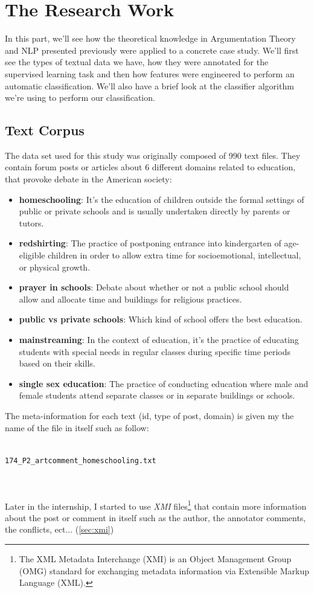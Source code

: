 \chapter{The Research Work} 
In this part, we'll see how the theoretical knowledge in Argumentation Theory and NLP presented previously were applied to a concrete case study. We'll first see the types of textual data we have, how they were annotated for the supervised learning task and then how features were engineered to perform an automatic classification. We'll also have a brief look at the classifier algorithm we're using to perform our classification. 
\section{Text Corpus}
The data set used for this study was originally composed of 990 text files. They contain forum posts or articles about 6 different domains related to education, that provoke debate in the American society:
\begin{itemize}
  \item \textbf{homeschooling}: It's the education of children outside the formal settings of public or private schools and is usually undertaken directly by parents or tutors. 
  \item \textbf{redshirting}: The practice of postponing entrance into kindergarten of age-eligible children in order to allow extra time for socioemotional, intellectual, or physical growth. 
  \item \textbf{prayer in schools}: Debate about whether or not a public school should allow and allocate time and buildings for religious practices.
  \item \textbf{public vs private schools}: Which kind of school offers the best education.
  \item \textbf{mainstreaming}: In the context of education, it's the practice of educating students with special needs in regular classes during specific time periods based on their skills.
  \item \textbf{single sex education}: The practice of conducting education where male and female students attend separate classes or in separate buildings or schools.  
\end{itemize} 

The meta-information for each text (id, type of post, domain) is given my the name of the file in itself such as follow:
\\
\\
\centerline{\texttt{174\_P2\_artcomment\_homeschooling.txt}}
\\
\\
Later in the internship, I started to use \textit{XMI} files\footnote{The XML Metadata Interchange (XMI) is an Object Management Group (OMG) standard for exchanging metadata information via Extensible Markup Language (XML).} that contain more information about the post or comment in itself such as the author, the annotator comments, the conflicts, ect... (\cref{sec:xmi})

